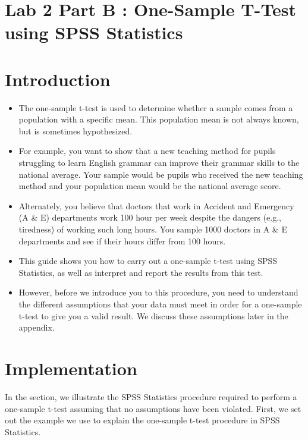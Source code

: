 \documentclass[]{article}
\begin{document}
	
\section*{Lab 2 Part B : One-Sample T-Test using SPSS Statistics}

\section{Introduction}
\begin{itemize}
	\item The one-sample t-test is used to determine whether a sample comes from a population with a specific mean. This population mean is not always known, but is sometimes hypothesized. 
\item For example, you want to show that a new teaching method for pupils struggling to learn English grammar can improve their grammar skills to the national average. Your sample would be pupils who received the new teaching method and your population mean would be the national average score. 
\item Alternately, you believe that doctors that work in Accident and Emergency (A \& E) departments work 100 hour per week despite the dangers (e.g., tiredness) of working such long hours. You sample 1000 doctors in A \& E departments and see if their hours differ from 100 hours.
	
\item This guide shows you how to carry out a one-sample t-test using SPSS Statistics, as well as interpret and report the results from this test. \item However, before we introduce you to this procedure, you need to understand the different assumptions that your data must meet in order for a one-sample t-test to give you a valid result. We discuss these assumptions later in the appendix.
\end{itemize}



\section{Implementation}
In the section,  we illustrate the SPSS Statistics procedure required to perform a one-sample t-test assuming that no assumptions have been violated. First, we set out the example we use to explain the one-sample t-test procedure in SPSS Statistics.

\end{document}
